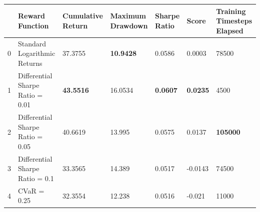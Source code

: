 \begin{tabular}{lllllll}
\toprule
 & Reward Function & Cumulative Return & Maximum Drawdown & Sharpe Ratio & Score & Training Timesteps Elapsed \\
\midrule
0 & Standard Logarithmic Returns & 37.3755 & \textbf{10.9428} & 0.0586 & 0.0003 & 78500 \\
1 & Differential Sharpe Ratio = 0.01 & \textbf{43.5516} & 16.0534 & \textbf{0.0607} & \textbf{0.0235} & 4500 \\
2 & Differential Sharpe Ratio = 0.05 & 40.6619 & 13.995 & 0.0575 & 0.0137 & \textbf{105000} \\
3 & Differential Sharpe Ratio = 0.1 & 33.3565 & 14.389 & 0.0517 & -0.0143 & 74500 \\
4 & CVaR = 0.25 & 32.3554 & 12.238 & 0.0516 & -0.021 & 11000 \\
\bottomrule
\end{tabular}
